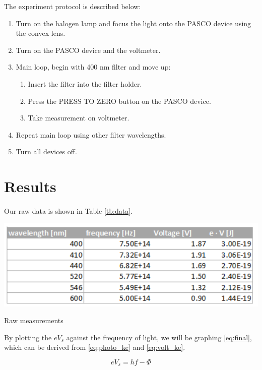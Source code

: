 \documentclass{article}
\begin{document}
The experiment protocol is described below:

\begin{enumerate}
  \item Turn on the halogen lamp and focus the light onto the PASCO device using the convex lens.
  \item Turn on the PASCO device and the voltmeter.
  \item Main loop, begin with 400 nm filter and move up:
  \begin{enumerate}
    \item Insert the filter into the filter holder.
    \item Press the PRESS TO ZERO button on the PASCO device.
    \item Take measurement on voltmeter.
  \end{enumerate}
  \item Repeat main loop using other filter wavelengths.
  \item Turn all devices off.
\end{enumerate}

\section{Results}
\paragraph{}
Our raw data is shown in Table \ref{tb:data}.
\begin{table}[h]
  \includegraphics{./img/table_data.pdf}
  \caption{Raw measurements}
  \label{tb:data}
\end{table}
By plotting the $eV_s$ against the frequency of light, we will be graphing \eqref{eq:final}, which can be derived from \eqref{eq:photo_ke} and \eqref{eq:volt_ke}.

\begin{equation}\label{eq:final}
  eV_s = hf - \Phi
\end{equation}
\end{document}
